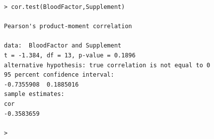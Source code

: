\documentclass[a4paper,12pt]{article}
\begin{document}
\begin{itemize}
\begin{framed}
\begin{verbatim}
> cor.test(BloodFactor,Supplement)

Pearson's product-moment correlation

data:  BloodFactor and Supplement
t = -1.384, df = 13, p-value = 0.1896
alternative hypothesis: true correlation is not equal to 0
95 percent confidence interval:
-0.7355908  0.1885016
sample estimates:
cor 
-0.3583659 

> 

\end{verbatim}
\end{framed}
\end{itemize}



\newpage
\end{document}
